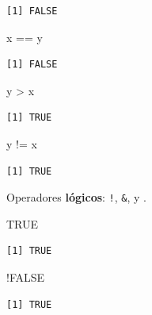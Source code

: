 \documentclass[
  letterpaper,
  DIV=11,
  numbers=noendperiod]{scrartcl}
\newenvironment{Shaded}{\begin{snugshade}}{\end{snugshade}}
\newcommand{\ConstantTok}[1]{\textcolor[rgb]{0.56,0.35,0.01}{#1}}
\newcommand{\NormalTok}[1]{\textcolor[rgb]{0.00,0.23,0.31}{#1}}
\newcommand{\SpecialCharTok}[1]{\textcolor[rgb]{0.37,0.37,0.37}{#1}}
\begin{document}
\begin{verbatim}
[1] FALSE
\end{verbatim}

\begin{Shaded}
\begin{Highlighting}[]
\NormalTok{x }\SpecialCharTok{==}\NormalTok{ y }
\end{Highlighting}
\end{Shaded}

\begin{verbatim}
[1] FALSE
\end{verbatim}

\begin{Shaded}
\begin{Highlighting}[]
\NormalTok{y }\SpecialCharTok{\textgreater{}}\NormalTok{ x }
\end{Highlighting}
\end{Shaded}

\begin{verbatim}
[1] TRUE
\end{verbatim}

\begin{Shaded}
\begin{Highlighting}[]
\NormalTok{y }\SpecialCharTok{!=}\NormalTok{ x}
\end{Highlighting}
\end{Shaded}

\begin{verbatim}
[1] TRUE
\end{verbatim}

Operadores \textbf{lógicos}: \texttt{!}, \texttt{\&}, y
\texttt{\textbar{}}.

\begin{Shaded}
\begin{Highlighting}[]
\ConstantTok{TRUE} 
\end{Highlighting}
\end{Shaded}

\begin{verbatim}
[1] TRUE
\end{verbatim}

\begin{Shaded}
\begin{Highlighting}[]
\SpecialCharTok{!}\ConstantTok{FALSE} 
\end{Highlighting}
\end{Shaded}

\begin{verbatim}
[1] TRUE
\end{verbatim}
\end{document}
